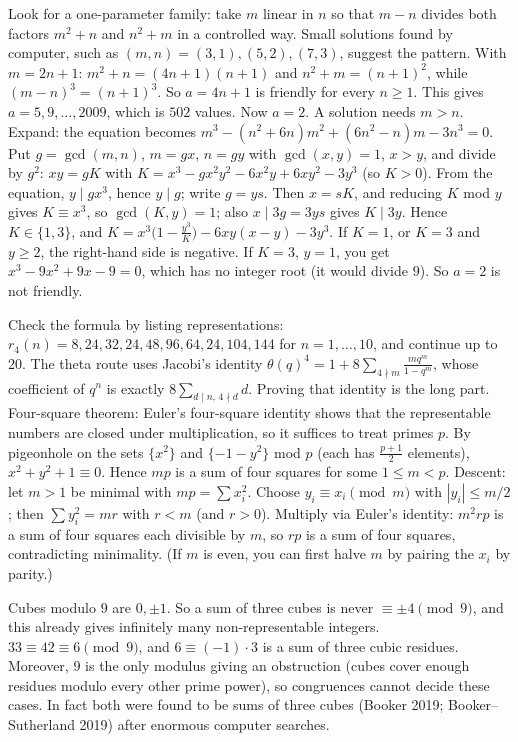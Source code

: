 \documentclass[11pt,a4paper]{article}
\begin{document}
 Look for a one-parameter family: take $m$ linear in $n$ so that $m-n$ divides both factors $m^2+n$ and $n^2+m$ in a controlled way. Small solutions found by computer, such as $(m,n)=(3,1),(5,2),(7,3)$, suggest the pattern.
 With $m=2n+1$: $m^2+n=(4n+1)(n+1)$ and $n^2+m=(n+1)^2$, while $(m-n)^3=(n+1)^3$. So $a=4n+1$ is friendly for every $n\ge1$. This gives $a=5,9,\dots,2009$, which is $502$ values.
 Now $a=2$. A solution needs $m>n$. Expand: the equation becomes $m^3-(n^2+6n)m^2+(6n^2-n)m-3n^3=0$. Put $g=\gcd(m,n)$, $m=gx$, $n=gy$ with $\gcd(x,y)=1$, $x>y$, and divide by $g^2$: $xy=gK$ with $K=x^3-gx^2y^2-6x^2y+6xy^2-3y^3$ (so $K>0$).
 From the equation, $y\mid gx^3$, hence $y\mid g$; write $g=ys$. Then $x=sK$, and reducing $K$ mod $y$ gives $K\equiv x^3$, so $\gcd(K,y)=1$; also $x\mid3g=3ys$ gives $K\mid3y$. Hence $K\in\{1,3\}$, and $K=x^3\bigl(1-\frac{y^3}{K}\bigr)-6xy(x-y)-3y^3$.
 If $K=1$, or $K=3$ and $y\ge2$, the right-hand side is negative. If $K=3$, $y=1$, you get $x^3-9x^2+9x-9=0$, which has no integer root (it would divide $9$). So $a=2$ is not friendly.

 Check the formula by listing representations: $r_4(n)=8,24,32,24,48,96,64,24,104,144$ for $n=1,\dots,10$, and continue up to $20$. The theta route uses Jacobi's identity $\theta(q)^4=1+8\sum_{4\nmid m}\frac{mq^m}{1-q^m}$, whose coefficient of $q^n$ is exactly $8\sum_{d\mid n,\,4\nmid d}d$. Proving that identity is the long part.
 Four-square theorem: Euler's four-square identity shows that the representable numbers are closed under multiplication, so it suffices to treat primes $p$. By pigeonhole on the sets $\{x^2\}$ and $\{-1-y^2\}$ mod $p$ (each has $\frac{p+1}2$ elements), $x^2+y^2+1\equiv0$. Hence $mp$ is a sum of four squares for some $1\le m<p$.
 Descent: let $m>1$ be minimal with $mp=\sum x_i^2$. Choose $y_i\equiv x_i\pmod m$ with $|y_i|\le m/2$; then $\sum y_i^2=mr$ with $r<m$ (and $r>0$). Multiply via Euler's identity: $m^2rp$ is a sum of four squares each divisible by $m$, so $rp$ is a sum of four squares, contradicting minimality. (If $m$ is even, you can first halve $m$ by pairing the $x_i$ by parity.)

 Cubes modulo $9$ are $0,\pm1$. So a sum of three cubes is never $\equiv\pm4\pmod9$, and this already gives infinitely many non-representable integers.
 $33\equiv42\equiv6\pmod9$, and $6\equiv(-1)\cdot3$ is a sum of three cubic residues. Moreover, $9$ is the only modulus giving an obstruction (cubes cover enough residues modulo every other prime power), so congruences cannot decide these cases. In fact both were found to be sums of three cubes (Booker 2019; Booker--Sutherland 2019) after enormous computer searches.
\end{document}

